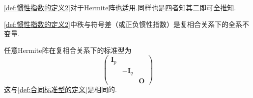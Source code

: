 \begin{red}
    \begin{remark}
        \cref{def:惯性指数的定义2}对于\textup{Hermite}阵也适用.同样也是四者知其二即可全推知.
    \end{remark}
\end{red}
\begin{formal}
    \begin{theorem}[全系不变量]\label{thm:全系不变量2}
        \cref{def:惯性指数的定义2}中秩与符号差（或正负惯性指数）是复相合关系下的全系不变量.
    \end{theorem}
\end{formal}
\begin{formal}
    \begin{theorem}[复相合标准型]\label{thm:复相合标准型}
        任意\textup{Hermite}阵在复相合关系下的标准型为\newpage\[
        \begin{pmatrix}
            \bm{I}_p&&\\
            &-\bm{I}_q&\\
            &&\bm{O}
        \end{pmatrix}
        \]这与\cref{def:合同标准型的定义}是相同的.
    \end{theorem}
\end{formal}
